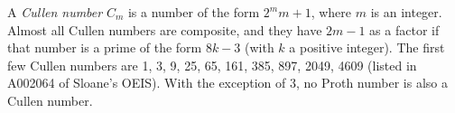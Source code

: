 \documentclass[12pt]{article}
\begin{document}
A {\em Cullen number} $C_m$ is a number of the form $2^m m + 1$, where $m$ is an integer. Almost all Cullen numbers are composite, and they have $2m - 1$ as a factor if that number is a prime of the form $8k - 3$ (with $k$ a positive integer). The first few Cullen numbers are 1, 3, 9, 25, 65, 161, 385, 897, 2049, 4609 (listed in A002064 of Sloane's OEIS). With the exception of 3, no Proth number is also a Cullen number. 
\end{document}
